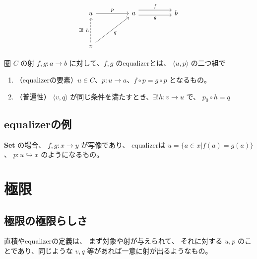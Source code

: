 \documentclass[uplatex,a4j,12pt,dvipdfmx]{jsarticle}
\begin{document}
\[
	\begin{tikzcd}
		u \arrow[rr, "p"]                                        &  & a \arrow[rr, "f", shift left=2] \arrow[rr, "g"', shift right] &  & b \\
		&  &                                                               &  &   \\
		v \arrow[rruu, "q"'] \arrow[uu, "\exists ! \ h", dashed] &  &                                                               &  &
	\end{tikzcd}
\]


圏 $C$ の射 $f,g : a \to b$ に対して、$f,g$ のequalizerとは、
$\langle u, p \rangle$ の二つ組で

\begin{enumerate}
	\item （equalizerの要素）$u \in C$、$p: u \to a$、$f \circ p = g \circ p$ となるもの。
	\item （普遍性） $\langle v, q \rangle$ が同じ条件を満たすとき、$\exists ! h: v \to u$ で、
	      $p_{0} \circ h = q$
\end{enumerate}


\subsection{equalizerの例}

\textbf{Set} の場合、
$f,g: x \to y$ が写像であり、
equalizerは $u = \{ a \in x | f(a) = g(a) \}$、
$p : u \hookrightarrow x $
のようになるもの。


\section{極限}

\subsection{極限の極限らしさ}

直積やequalizerの定義は、
まず対象や射が与えられて、
それに対する $u,p$ のことであり、同じような $v,q$ 等があれば一意に射が出るようなもの。
\end{document}
